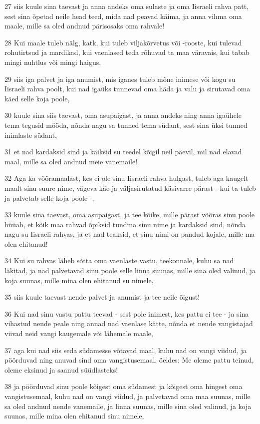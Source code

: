 \par 27 siis kuule sina taevast ja anna andeks oma sulaste ja oma Iisraeli rahva patt, sest sina õpetad neile head teed, mida nad peavad käima, ja anna vihma oma maale, mille sa oled andnud pärisosaks oma rahvale!
\par 28 Kui maale tuleb nälg, katk, kui tuleb viljakõrvetus või -rooste, kui tulevad rohutirtsud ja mardikad, kui vaenlased teda rõhuvad ta maa väravais, kui tabab mingi nuhtlus või mingi haigus,
\par 29 siis iga palvet ja iga anumist, mis iganes tuleb mõne inimese või kogu su Iisraeli rahva poolt, kui nad igaüks tunnevad oma häda ja valu ja sirutavad oma käed selle koja poole,
\par 30 kuule sina siis taevast, oma asupaigast, ja anna andeks ning anna igaühele tema tegusid mööda, nõnda nagu sa tunned tema südant, sest sina üksi tunned inimlaste südant,
\par 31 et nad kardaksid sind ja käiksid su teedel kõigil neil päevil, mil nad elavad maal, mille sa oled andnud meie vanemaile!
\par 32 Aga ka võõramaalast, kes ei ole sinu Iisraeli rahva hulgast, tuleb aga kaugelt maalt sinu suure nime, vägeva käe ja väljasirutatud käsivarre pärast - kui ta tuleb ja palvetab selle koja poole -,
\par 33 kuule sina taevast, oma asupaigast, ja tee kõike, mille pärast võõras sinu poole hüüab, et kõik maa rahvad õpiksid tundma sinu nime ja kardaksid sind, nõnda nagu su Iisraeli rahvas, ja et nad teaksid, et sinu nimi on pandud kojale, mille ma olen ehitanud!
\par 34 Kui su rahvas läheb sõtta oma vaenlaste vastu, teekonnale, kuhu sa nad läkitad, ja nad palvetavad sinu poole selle linna suunas, mille sina oled valinud, ja koja suunas, mille mina olen ehitanud su nimele,
\par 35 siis kuule taevast nende palvet ja anumist ja tee neile õigust!
\par 36 Kui nad sinu vastu pattu teevad - sest pole inimest, kes pattu ei tee - ja sina vihastud nende peale ning annad nad vaenlase kätte, nõnda et nende vangistajad viivad neid vangi kaugemale või lähemale maale,
\par 37 aga kui nad siis seda südamesse võtavad maal, kuhu nad on vangi viidud, ja pöörduvad ning anuvad sind oma vangistusemaal, öeldes: Me oleme pattu teinud, oleme eksinud ja saanud süüdlasteks!
\par 38 ja pöörduvad sinu poole kõigest oma südamest ja kõigest oma hingest oma vangistusemaal, kuhu nad on vangi viidud, ja palvetavad oma maa suunas, mille sa oled andnud nende vanemaile, ja linna suunas, mille sina oled valinud, ja koja suunas, mille mina olen ehitanud sinu nimele,
